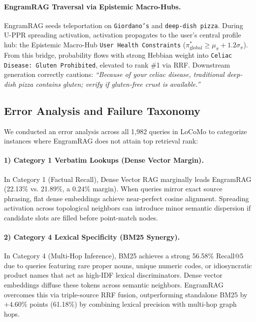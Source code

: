 \documentclass[conference]{IEEEtran}
\begin{document}
\paragraph{EngramRAG Traversal via Epistemic Macro-Hubs.}
EngramRAG seeds teleportation on \texttt{Giordano's} and \texttt{deep-dish pizza}. During U-PPR spreading activation, activation propagates to the user's central profile hub: the Epistemic Macro-Hub \texttt{User Health Constraints} ($\pi^*_{\text{global}} \ge \mu_\pi + 1.2\sigma_\pi$). From this bridge, probability flows with strong Hebbian weight into \texttt{Celiac Disease: Gluten Prohibited}, elevated to rank \#1 via RRF. Downstream generation correctly cautions: \textit{``Because of your celiac disease, traditional deep-dish pizza contains gluten; verify if gluten-free crust is available.''}

\subsection{Error Analysis and Failure Taxonomy}
We conducted an error analysis across all 1,982 queries in LoCoMo to categorize instances where EngramRAG does not attain top retrieval rank:

\paragraph{1) Category 1 Verbatim Lookups (Dense Vector Margin).} In Category 1 (Factual Recall), Dense Vector RAG marginally leads EngramRAG (22.13\% vs. 21.89\%, a $0.24\%$ margin). When queries mirror exact source phrasing, flat dense embeddings achieve near-perfect cosine alignment. Spreading activation across topological neighbors can introduce minor semantic dispersion if candidate slots are filled before point-match nodes.

\paragraph{2) Category 4 Lexical Specificity (BM25 Synergy).} In Category 4 (Multi-Hop Inference), BM25 achieves a strong 56.58\% Recall@5 due to queries featuring rare proper nouns, unique numeric codes, or idiosyncratic product names that act as high-IDF lexical discriminators. Dense vector embeddings diffuse these tokens across semantic neighbors. EngramRAG overcomes this via triple-source RRF fusion, outperforming standalone BM25 by $+4.60\%$ points (61.18\%) by combining lexical precision with multi-hop graph hops.
\end{document}
